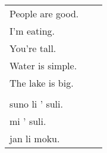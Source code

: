 \begin{supertabular}{p{5cm}|ll}
People are good. && \\ %
I'm eating. &&  \\ %
You're tall. &&  \\ %
Water is simple. &&  \\ %
The lake is big. &&\\ %
 && \\ %
suno li ' suli. &&  \\%
mi ' suli. &&  \\%
jan li moku. &&  \\%
\end{supertabular} \\%
%
